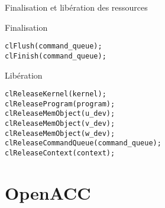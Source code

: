 \documentclass[handout,francais]{beamer}
\begin{document}
\begin{frame}[fragile]{Finalisation et libération des ressources}
\begin{block}{Finalisation}
\begin{lstlisting}
clFlush(command_queue);
clFinish(command_queue);
\end{lstlisting}
\end{block}

\begin{block}{Libération}
\begin{lstlisting}
clReleaseKernel(kernel);
clReleaseProgram(program);
clReleaseMemObject(u_dev);
clReleaseMemObject(v_dev);
clReleaseMemObject(w_dev);
clReleaseCommandQueue(command_queue);
clReleaseContext(context);
\end{lstlisting}
\end{block}
\end{frame}

\section{OpenACC}
\end{document}
